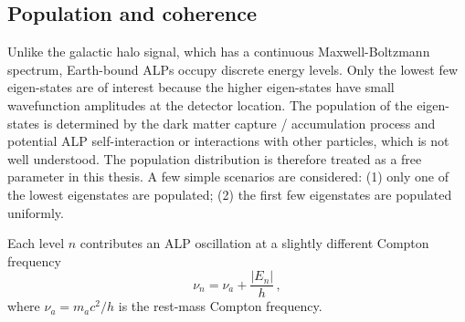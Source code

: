 \subsection{Population and coherence}\label{sec:theory:earthALP:coherence}

Unlike the galactic halo signal, which has a continuous Maxwell-Boltzmann spectrum, Earth-bound ALPs occupy discrete energy levels. 
Only the lowest few eigen-states are of interest because the higher eigen-states have small wavefunction amplitudes at the detector location.
The population of the eigen-states is determined by the dark matter capture / accumulation process and potential ALP self-interaction or interactions with other particles, which is not well understood. 
The population distribution is therefore treated as a free parameter in this thesis. 
A few simple scenarios are considered: (1) only one of the lowest eigenstates are populated; (2) the first few eigenstates are populated uniformly.


Each level $n$ contributes an ALP oscillation at a slightly different Compton frequency
\begin{equation}
    \nu_n = \nu_a + \frac{|E_n|}{h}
    \,,\label{eq:nu_bound}
\end{equation}
where $\nu_a = m_a c^2/h$ is the rest-mass Compton frequency.

